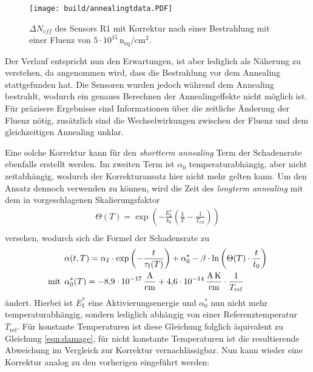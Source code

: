 \begin{figure}[!htb]
  \centering
    \texttt{[image: build/annealingtdata.PDF]}
\caption{$\Delta N_{eff}$ des Sensors R1 mit Korrektur nach einer Bestrahlung mit einer Fluenz von $5\cdot 10^{15} \, \mathrm{n_{eq}/cm^2}$.}
\label{fig:korrektur_N_eff}
\end{figure}



Der Verlauf entspricht nun den Erwartungen, ist aber lediglich als Näherung zu verstehen, da angenommen
wird, dass die Bestrahlung vor dem Annealing stattgefunden hat. Die Sensoren wurden jedoch
während dem Annealing bestrahlt, wodurch ein genaues Berechnen der Annealingeffekte nicht
möglich ist. Für präzisere Ergebnisse sind Informationen über die zeitliche Änderung der Fluenz nötig,
zusätzlich sind die Wechselwirkungen zwischen der Fluenz und dem gleichzeitigen Annealing unklar.




Eine solche Korrektur kann für den \textit{shortterm annealing} Term der Schadensrate ebenfalls erstellt werden.
Im zweiten Term ist $\alpha_{0}$ temperaturabhängig, aber nicht zeitabhängig,
wodurch der Korrekturansatz hier nicht mehr gelten kann. Um den Ansatz dennoch
verwenden zu können, wird die Zeit des \textit{longterm annealing} mit dem in \cite{moll} vorgeschlagenen
Skalierungsfaktor
\begin{align}
  \Theta(T) =  \exp{\left(-\frac{E_{\mathrm{I}}^*}{k_b}\left(\frac{1}{T}-\frac{1}{T_{\mathrm{ref}}}\right)\right)} \\
\end{align}
versehen, wodurch sich die Formel der Schadensrate  zu
\begin{align}
  &\alpha(t, T) = \alpha_I \cdot \exp{\left(-\frac{t}{\tau_{\mathrm{I}}(T)}\right)} + \alpha_{\mathrm{0}}^{*} -\beta \cdot \ln{\left(\Theta(T) \cdot \frac{t}{t_{\mathrm{0}}}\right)} \\
  \medskip
  \text{mit}\:\: &\alpha^*_{\mathrm{0}}(T) = \SI{-8.9e-17}{\ampere\per\centi\meter} + \SI{4.6e-14}{\ampere\kelvin\per\centi\meter} \cdot \frac{1}{T_{\mathrm{ref}}}
\end{align}
ändert.
Hierbei ist $E_{\mathrm{I}}^*$ eine Aktivierungsenergie und $\alpha^*_{0}$ nun nicht mehr temperaturabhängig,
sondern lediglich abhängig von einer Referenztemperatur $T_{\mathrm{ref}}$. Für konstante Temperaturen
ist diese Gleichung folglich äquivalent zu Gleichung \ref{eqn:damage}, für nicht
konstante Temperaturen ist die resultierende Abweichung im Vergleich zur Korrektur vernachlässigbar.
Nun kann wieder eine Korrektur analog zu den vorherigen eingeführt werden:


